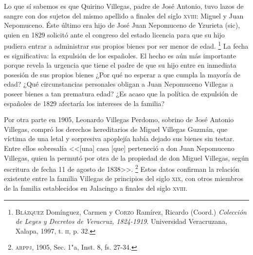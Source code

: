 \documentclass[14pt,twoside,final]{extbook} %
\let\oldfootnote\footnote
\renewcommand\footnote[1]{%
\oldfootnote{\hspace{1mm}#1}}
\begin{document}
Lo que sí sabemos es que Quirino Villegas, padre de José Antonio, tuvo lazos de sangre con dos sujetos del mismo apellido a finales del siglo \textsc{xviii}: Miguel y Juan Nepomuceno. Éste último era hijo de José Juan Nepomuceno de Yzurieta (sic), quien en 1829 solicitó ante el congreso del estado licencia para que su hijo pudiera entrar a administrar sus propios bienes por ser menor de edad.\footnote{\textsc{Blázquez} Domínguez, Carmen y \textsc{Corzo} Ramírez, Ricardo (Coord.) \emph{Colección de Leyes y Decretos de Veracruz, 1824-1919}. Universidad Veracruzana, Xalapa, 1997, t. \textsc{ii}, p. 32.} La fecha es significativa: la expulsión de los españoles. El hecho es aún más importante porque revela la urgencia que tiene el padre de que su hijo entre en inmediata posesión de sus propios bienes ¿Por qué no esperar a que cumpla la mayoría de edad? ¿Qué circunstancias personales obligan a Juan Nepomuceno Villegas a poseer bienes a tan prematura edad? ¿Es acaso que la política de expulsión de españoles de 1829 afectaría los intereses de la familia?

Por otra parte en 1905, Leonardo Villegas Perdomo, sobrino de José Antonio Villegas, compró los derechos hereditarios de Miguel Villegas Guzmán, que víctima de una letal y sorpresiva apoplejía había dejado sus bienes sin testar. Entre ellos sobresalía <<[una] casa [que] perteneció a don Juan Nepomuceno Villegas, quien la permutó por otra de la propiedad de don Miguel Villegas, según escritura de fecha 11 de agosto de 1838>>.\footnote{\textsc{arppj}, 1905, Sec. 1"a, Inst. 8, fs. 27-34.} Estos datos confirman la relación existente entre la familia Villegas de principios del siglo \textsc{xix}, con otros miembros de la familia establecidos en Jalacingo a finales del siglo \textsc{xviii}.
\end{document}
